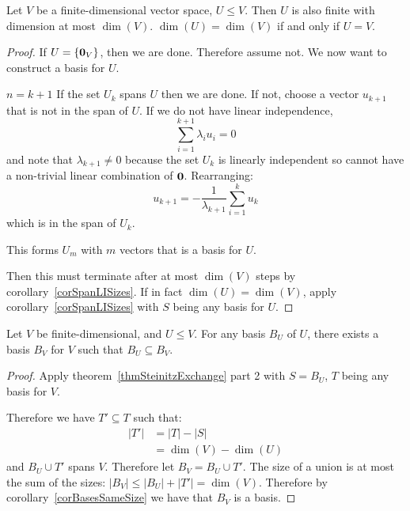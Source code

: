 \documentclass[../Main.tex]{subfiles}
\begin{document}
\begin{corollary}
    Let $V$ be a finite-dimensional vector space, $U \leq V$. Then $U$ is also finite with dimension at most $\dim(V)$. $\dim(U) = \dim(V)$ if and only if $U = V$.
    \label{corSubspaceDim}
\end{corollary}
\begin{proof}
    If $U = \{\boldsymbol{0}_V\}$, then we are done. Therefore assume not. We now want to construct a basis for $U$.

    {$n = k + 1$}{
        If the set $U_k$ spans $U$ then we are done. If not, choose a vector $u_{k+1}$ that is not in the span of $U$. If we do not have linear independence,
        \begin{equation*}
            \sum_{i = 1}^{k+1} \lambda_iu_{i} = 0
        \end{equation*}
        and note that $\lambda_{k+1} \neq 0$ because the set $U_k$ is linearly independent so cannot have a non-trivial linear combination of $\boldsymbol{0}$.
        Rearranging:
        \begin{equation*}
            u_{k + 1} = -\frac{1}{\lambda_{k+1}} \sum_{i=1}^{k} u_k
        \end{equation*}
        which is in the span of $U_k$.~\contradiction
    }

    This forms $U_m$ with $m$ vectors that is a basis for $U$.

    Then this must terminate after at most $\dim(V)$ steps by corollary~\ref{corSpanLISizes}. If in fact $\dim(U) = \dim(V)$, apply corollary~\ref{corSpanLISizes} with $S$ being any basis for $U$.
\end{proof}
\begin{proposition}
    Let $V$ be finite-dimensional, and $U \leq V$. For any basis $B_U$ of $U$, there exists a basis $B_V$ for $V$ such that $B_U \subseteq B_V$.
    \label{propBasisExtension}
\end{proposition}
\begin{proof}
    Apply theorem~\ref{thmSteinitzExchange} part 2 with $S = B_U$, $T$ being any basis for $V$.

    Therefore we have $T' \subseteq T$ such that:
    \begin{align*}
        |T'| &= |T| - |S| \\
        &= \dim(V) - \dim(U)
    \end{align*}
    and $B_U \cup T'$ spans $V$. Therefore let $B_V = B_U \cup T'$. The size of a union is at most the sum of the sizes: $|B_V| \leq |B_U| + |T'| = \dim(V)$. Therefore by corollary~\ref{corBasesSameSize} we have that $B_V$ is a basis.
\end{proof}
\end{document}
